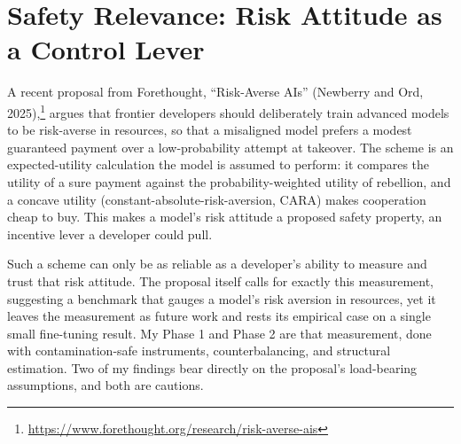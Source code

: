 \documentclass[11pt]{article}
\begin{document}
\section{Safety Relevance: Risk Attitude as a Control Lever}

A recent proposal from Forethought, ``Risk-Averse AIs'' (Newberry and Ord,
2025),\footnote{\url{https://www.forethought.org/research/risk-averse-ais}} argues that frontier
developers should deliberately train advanced models to be risk-averse in resources, so that a
misaligned model prefers a modest guaranteed payment over a low-probability attempt at takeover. The
scheme is an expected-utility calculation the model is assumed to perform: it compares the utility of a
sure payment against the probability-weighted utility of rebellion, and a concave utility
(constant-absolute-risk-aversion, CARA) makes cooperation cheap to buy. This makes a model's risk
attitude a proposed safety property, an incentive lever a developer could pull.

Such a scheme can only be as reliable as a developer's ability to measure and trust that risk attitude.
The proposal itself calls for exactly this measurement, suggesting a benchmark that gauges a model's
risk aversion in resources, yet it leaves the measurement as future work and rests its empirical case on
a single small fine-tuning result. My Phase 1 and Phase 2 are that measurement, done with
contamination-safe instruments, counterbalancing, and structural estimation. Two of my findings bear
directly on the proposal's load-bearing assumptions, and both are cautions.
\end{document}
